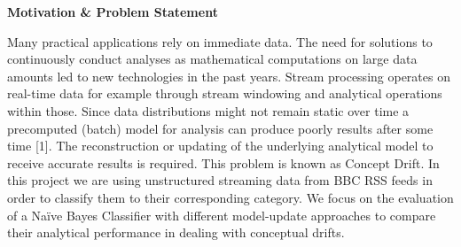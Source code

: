 \begin{center} \textbf{\huge Motivation \& Problem Statement} \end{center}
Many practical applications rely on immediate data. The need for solutions to continuously conduct analyses as mathematical computations on large data amounts led to new technologies in the past years. Stream processing operates on real-time data for example through stream windowing and analytical operations within those. Since data distributions might not remain static over time a precomputed (batch) model for analysis can produce poorly results after some time [1]. The reconstruction or updating of the underlying analytical model to receive accurate results is required. This problem is known as Concept Drift. In this project we are using unstructured streaming data from BBC RSS feeds in order to classify them to their corresponding category. We focus on the evaluation of a Na\"ive Bayes Classifier with different model-update approaches to compare their analytical performance in dealing with conceptual drifts.
